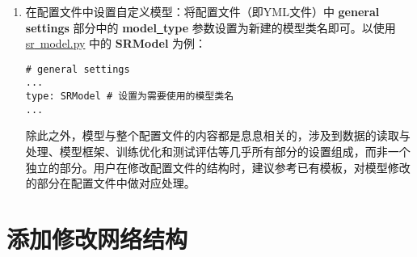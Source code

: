 \documentclass[../main.tex]{subfiles}
\begin{document}
\begin{enumerate}
	\item 在配置文件中设置自定义模型：将配置文件（即YML文件）中 \textbf{general settings} 部分中的 \textbf{model\underline{~}type} 参数设置为新建的模型类名即可。以使用 \href{https://github.com/XPixelGroup/BasicSR/tree/master/basicsr/models/sr_model.py}{sr\underline{~}model.py} 中的 \textbf{SRModel} 为例：
\begin{verbatim}
# general settings
...
type: SRModel # 设置为需要使用的模型类名
...
\end{verbatim}
	除此之外，模型与整个配置文件的内容都是息息相关的，涉及到数据的读取与处理、模型框架、训练优化和测试评估等几乎所有部分的设置组成，而非一个独立的部分。用户在修改配置文件的结构时，建议参考已有模板，对模型修改的部分在配置文件中做对应处理。
	
\end{enumerate}

\section{添加修改网络结构}\label{howto:add_arch}
\end{document}
